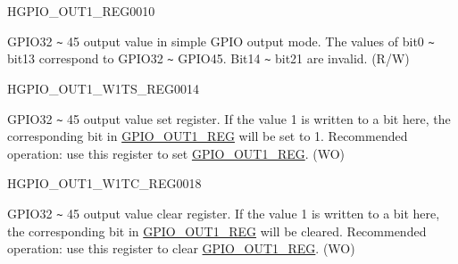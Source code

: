 \begin{register}{H}{GPIO\_OUT1\_REG}{\hexprefix{}0010}\label{regdesc:GPIOOUT1REG}
%
%
\regnewline%
\begin{regdesc}\begin{reglist}
\label{fielddesc:GPIOOUT1DATAORIG}\item [GPIO\_OUT1\_DATA\_ORIG] GPIO32 \verb+~+ 45 output value in simple GPIO output mode. The values of bit0 \verb+~+ bit13 correspond to GPIO32 \verb+~+ GPIO45. Bit14 \verb+~+ bit21 are invalid. (R/W)
\end{reglist}\end{regdesc}
\end{register}


\begin{register}{H}{GPIO\_OUT1\_W1TS\_REG}{\hexprefix{}0014}\label{regdesc:GPIOOUT1W1TSREG}
%
%
\regnewline%
\begin{regdesc}\begin{reglist}
\label{fielddesc:GPIOOUT1W1TS}\item [GPIO\_OUT1\_W1TS] GPIO32 \verb+~+ 45 output value set register. If the value 1 is written to a bit here, the corresponding bit in \hyperref[regdesc:GPIOOUT1REG]{GPIO\_OUT1\_REG} will be set to 1. Recommended operation: use this register to set \hyperref[regdesc:GPIOOUT1REG]{GPIO\_OUT1\_REG}. (WO)
\end{reglist}\end{regdesc}
\end{register}


\begin{register}{H}{GPIO\_OUT1\_W1TC\_REG}{\hexprefix{}0018}\label{regdesc:GPIOOUT1W1TCREG}
%
%
\regnewline%
\begin{regdesc}\begin{reglist}
\label{fielddesc:GPIOOUT1W1TC}\item [GPIO\_OUT1\_W1TC] GPIO32 \verb+~+ 45 output value clear register. If the value 1 is written to a bit here, the corresponding bit in \hyperref[regdesc:GPIOOUT1REG]{GPIO\_OUT1\_REG} will be cleared. Recommended operation: use this register to clear \hyperref[regdesc:GPIOOUT1REG]{GPIO\_OUT1\_REG}. (WO)
\end{reglist}\end{regdesc}
\end{register}


